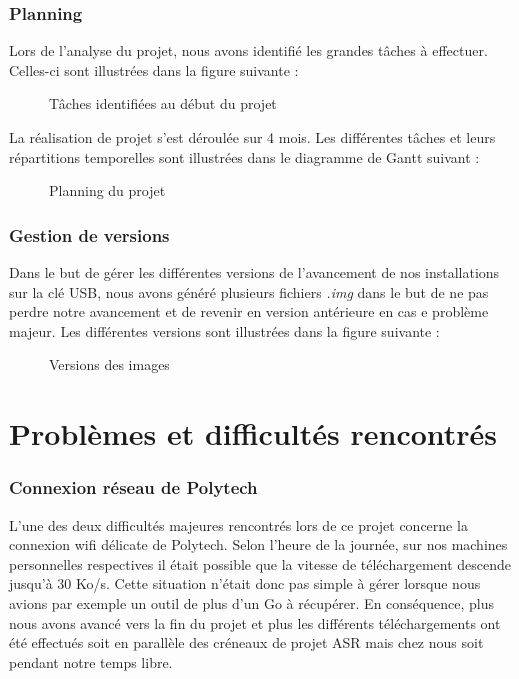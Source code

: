 \documentclass[final]{polytech/polytech}
\begin{document}
\section{Planning}
Lors de l'analyse du projet, nous avons identifié les grandes tâches à effectuer. Celles-ci sont illustrées dans la figure suivante :

\begin{figure}
	\caption{Tâches identifiées au début du projet}
	\label{fig:tasks}
\end{figure}

\vfill\eject

La réalisation de projet s'est déroulée sur 4 mois. Les différentes tâches et leurs répartitions temporelles sont illustrées dans le diagramme de Gantt suivant :

\begin{figure}
\caption{Planning du projet}
\label{fig:project_plan}
\end{figure}

\section{Gestion de versions}
Dans le but de gérer les différentes versions de l'avancement de nos installations sur la clé USB, nous avons généré plusieurs fichiers \textit{.img} dans le but de ne pas perdre notre avancement et de revenir en version antérieure en cas e problème majeur. Les différentes versions sont illustrées dans la figure suivante :

\begin{figure}
	\caption{Versions des images}
	\label{fig:images_versions}
\end{figure}

\part{Problèmes et difficultés rencontrés}

\section{Connexion réseau de Polytech}
L’une des deux difficultés majeures rencontrés lors de ce projet concerne la connexion wifi délicate de Polytech. Selon l’heure de la journée, sur nos machines personnelles respectives il était possible que la vitesse de téléchargement descende jusqu’à 30 Ko/s. Cette situation n’était donc pas simple à gérer lorsque nous avions par exemple un outil de plus d’un Go à récupérer. En conséquence, plus nous avons avancé vers la fin du projet et plus les différents téléchargements ont été effectués soit en parallèle des créneaux de projet ASR mais chez nous soit pendant notre temps libre.
\end{document}

